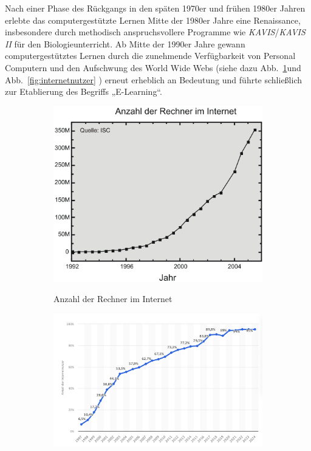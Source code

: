 Nach einer Phase des Rückgangs in den späten 1970er und frühen 1980er Jahren erlebte das computergestützte Lernen Mitte der 1980er Jahre eine Renaissance, insbesondere durch methodisch anspruchsvollere Programme wie \textit{KAVIS}/\textit{KAVIS II} für den Biologieunterricht. Ab Mitte der 1990er Jahre gewann computergestütztes Lernen durch die zunehmende Verfügbarkeit von Personal Computern und den Aufschwung des World Wide Webs (siehe dazu Abb.~\ref{fig:rechner_internet}und Abb.~\ref{fig:internetnutzer} ) erneut erheblich an Bedeutung und führte schließlich zur Etablierung des Begriffs „E-Learning“.\parencite[S.~11]{niegemann_kompendium_2008}

\begin{figure}[h!]
    \centering
    \begin{subfigure}[b]{0.48\textwidth}
        \centering
        \includegraphics[width=\textwidth]{img/Anzahl_Rechner_im_Internet-2004.png}
        \caption{Anzahl der Rechner im Internet}
        \label{fig:rechner_internet}
		\cite{internet_systems_consortium_internet_2005}
    \end{subfigure}
    \hfill
    \begin{subfigure}[b]{0.48\textwidth}
        \centering
        \includegraphics[width=\textwidth]{img/Anzahl_Internetnutzer-2024.png}

\end{subfigure}
\end{figure}
